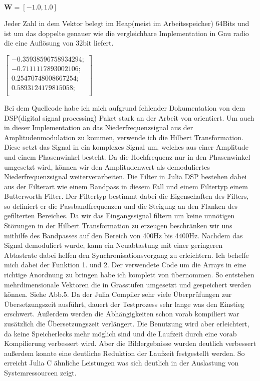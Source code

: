 \begin{multicols*}{2}
    \begin{math}
        \mathbf{W} =[-1.0, 1.0]
    \end{math}

    Jeder Zahl in dem Vektor belegt im Heap(meist im Arbeitsspeicher) 64Bits und ist um das doppelte genauer wie die vergleichbare Implementation in Gnu radio die eine Auflösung von 32bit liefert. 

    \begin{math}
        \begin{bmatrix}
            -0.35938596758934294;\\
            -0.7111117893002106;\\
            0.25470748008667254;\\
            0.5893124179815058;\\
        \end{bmatrix}
    \end{math}

    Bei dem Quellcode habe ich mich aufgrund fehlender Dokumentation von dem DSP(digital signal processing) Paket stark an der Arbeit von \cite[]{APTDecoder.jl}orientiert. Um auch in dieser Implementation an das Niederfrequenzsignal aus der Amplitudenmodulation zu kommen, verwende ich die Hilbert Transformation. Diese setzt das Signal in ein komplexes Signal um, welches aus einer Amplitude und einem Phasenwinkel besteht. Da die Hochfrequenz nur in den Phasenwinkel umgesetzt wird, können wir den Amplitudenwert als demoduliertes Niederfrequenzsignal weiterverarbeiten. Die Filter in Julia DSP bestehen dabei aus der Filterart wie einem Bandpass in diesem Fall und einem Filtertyp einem Butterworth Filter. Der Filtertyp bestimmt dabei die Eigenschaften des Filters, so definiert er die Passbandfrequenzen und die Steigung an den Flanken des gefilterten Bereiches. Da wir das Eingangssignal filtern um keine unnötigen Störungen in der Hilbert Transformation zu erzeugen beschränken wir uns mithilfe des Bandpasses auf den Bereich von 400Hz bis 4400Hz. Nachdem das Signal demoduliert wurde, kann ein Neuabtastung mit einer geringeren Abtastrate dabei helfen den Synchronisationsvorgang zu erleichtern. Ich behelfe mich dabei der Funktion 1. und 2. Der verwendete Code um die Arrays in eine richtige Anordnung zu bringen habe ich komplett von \cite[]{APTDecoder.jl} übernommen. So entstehen mehrdimensionale Vektoren die in Grasstufen umgesetzt und gespeichert werden können. Siehe Abb.5.
    Da der Julia Compiler sehr viele Überprüfungen zur Übersetzungszeit ausführt, dauert der Testprozess sehr lange was den Einstieg erschwert. Außerdem werden die Abhängigkeiten schon vorab kompiliert war zusätzlich die Übersetzungszeit verlängert. Die Benutzung wird aber erleichtert, da keine Speicherlecks mehr möglich sind und die Laufzeit durch eine vorab Kompilierung verbessert wird. Aber die Bildergebnisse wurden deutlich verbessert außerdem konnte eine deutliche Reduktion der Laufzeit festgestellt werden. So erreicht Julia C ähnliche Leistungen was sich deutlich in der Auslastung von Systemressourcen zeigt. 
\end{multicols*}
    
